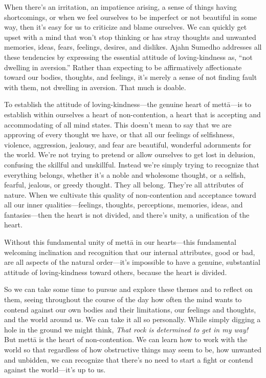 When there's an irritation, an impatience arising, a sense of things
having shortcomings, or when we feel ourselves to be imperfect or not
beautiful in some way, then it's easy for us to criticize and blame
ourselves. We can quickly get upset with a mind that won't stop thinking
or has stray thoughts and \mbox{unwanted} memories, ideas, fears,
feelings, desires, and dislikes. Ajahn Sumedho addresses all these
tendencies by expressing the essential attitude of loving-kindness as,
``not dwelling in aversion.'' Rather than expecting to be affirmatively
affectionate toward our bodies, thoughts, and feelings, it's merely a
sense of not finding fault with them, not dwelling in aversion. That
much is doable.

To establish the attitude of loving-kindness---the genuine heart of 
mettā---is to establish within ourselves a heart of non-contention, a 
heart that is accepting and accommodating of all mind states. This 
doesn't mean to say that we are approving of every thought we have, or 
that all our feelings of selfishness, violence, aggression, jealousy, 
and fear are beautiful, wonderful adornments for the world. We're not 
trying to pretend or allow ourselves to get lost in delusion, confusing 
the skillful and unskillful. Instead we're simply trying to recognize 
that everything belongs, whether it's a noble and wholesome thought, or 
a selfish, fearful, jealous, or greedy thought. They all belong. 
They're all attributes of nature. When we cultivate this quality of 
non-contention and acceptance toward all our inner 
qualities---feelings, thoughts, perceptions, memories, ideas, and 
fantasies---then the heart is not divided, and there's unity, a 
unification of the heart.

Without this fundamental unity of mettā in our hearts---this 
fundamental welcoming inclination and recognition that our internal 
attributes, good or bad, are all aspects of the natural order---it's 
impossible to have a genuine, substantial attitude of loving-kindness 
toward others, because the heart is divided.

So we can take some time to pursue and explore these themes and to 
reflect on them, seeing throughout the course of the day how often the 
mind wants to contend against our own bodies and their limitations, our 
feelings and thoughts, and the world around us. We can take it all so 
personally. While simply digging a hole in the ground we might think, 
\emph{That rock is determined to get in my way!} But mettā is the 
heart of non-contention. We can learn how to work with the world so 
that regardless of how obstructive things may seem to be, how unwanted 
and unbidden, we can recognize that there's no need to start a fight or 
contend against the world---it's up to us.


